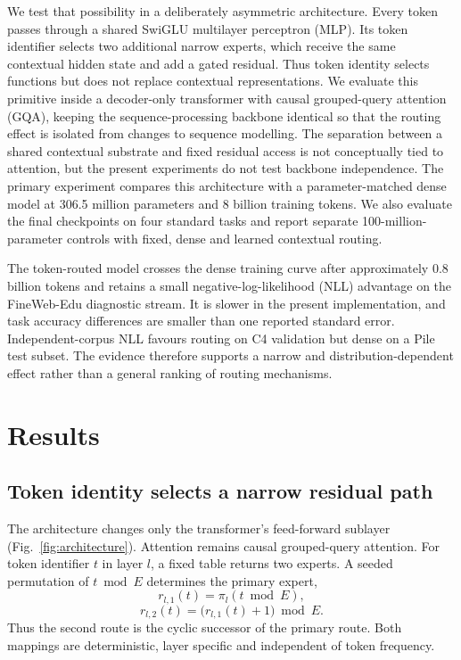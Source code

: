 \documentclass[11pt]{article}
\begin{document}
We test that possibility in a deliberately asymmetric architecture. Every token passes through a shared SwiGLU multilayer perceptron (MLP). Its token identifier selects two additional narrow experts, which receive the same contextual hidden state and add a gated residual. Thus token identity selects functions but does not replace contextual representations. We evaluate this primitive inside a decoder-only transformer with causal grouped-query attention (GQA), keeping the sequence-processing backbone identical so that the routing effect is isolated from changes to sequence modelling. The separation between a shared contextual substrate and fixed residual access is not conceptually tied to attention, but the present experiments do not test backbone independence. The primary experiment compares this architecture with a parameter-matched dense model at 306.5 million parameters and 8 billion training tokens. We also evaluate the final checkpoints on four standard tasks and report separate 100-million-parameter controls with fixed, dense and learned contextual routing.

The token-routed model crosses the dense training curve after approximately 0.8 billion tokens and retains a small negative-log-likelihood (NLL) advantage on the FineWeb-Edu diagnostic stream. It is slower in the present implementation, and task accuracy differences are smaller than one reported standard error. Independent-corpus NLL favours routing on C4 validation but dense on a Pile test subset. The evidence therefore supports a narrow and distribution-dependent effect rather than a general ranking of routing mechanisms.

\section*{Results}

\subsection*{Token identity selects a narrow residual path}

The architecture changes only the transformer's feed-forward sublayer (Fig.~\ref{fig:architecture}). Attention remains causal grouped-query attention. For token identifier $t$ in layer $l$, a fixed table returns two experts. A seeded permutation of $t\bmod E$ determines the primary expert,
\begin{equation}
r_{l,1}(t)=\pi_l(t\bmod E),
\end{equation}
\begin{equation}
r_{l,2}(t)=\bigl(r_{l,1}(t)+1\bigr)\bmod E.
\end{equation}
Thus the second route is the cyclic successor of the primary route. Both mappings are deterministic, layer specific and independent of token frequency.
\end{document}
